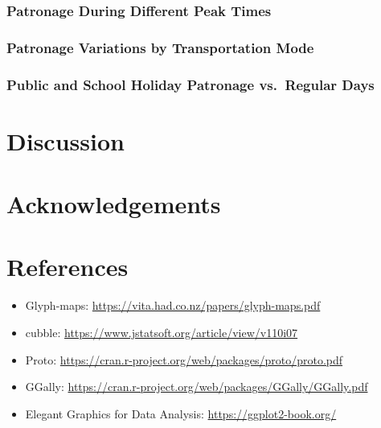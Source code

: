 \hypertarget{patronage-during-different-peak-times}{%
\subsubsection{Patronage During Different Peak Times}\label{patronage-during-different-peak-times}}

\hypertarget{patronage-variations-by-transportation-mode}{%
\subsubsection{Patronage Variations by Transportation Mode}\label{patronage-variations-by-transportation-mode}}

\hypertarget{public-and-school-holiday-patronage-vs.-regular-days}{%
\subsubsection{Public and School Holiday Patronage vs.~Regular Days}\label{public-and-school-holiday-patronage-vs.-regular-days}}

\hypertarget{discussion}{%
\section{Discussion}\label{discussion}}

\hypertarget{acknowledgements}{%
\section{Acknowledgements}\label{acknowledgements}}

\hypertarget{references}{%
\section{References}\label{references}}

\begin{itemize}
\item
  Glyph-maps: \url{https://vita.had.co.nz/papers/glyph-maps.pdf}
\item
  cubble: \url{https://www.jstatsoft.org/article/view/v110i07}
\item
  Proto: \url{https://cran.r-project.org/web/packages/proto/proto.pdf}
\item
  GGally: \url{https://cran.r-project.org/web/packages/GGally/GGally.pdf}
\item
  Elegant Graphics for Data Analysis: \url{https://ggplot2-book.org/}
\end{itemize}

